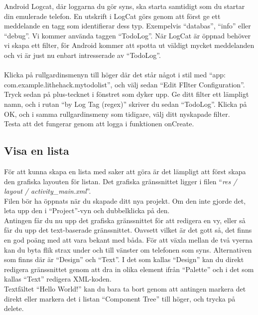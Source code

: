\documentclass[11 pt, titlepage]{article} %
\begin{document}
Android Logcat, där loggarna du gör syns, ska starta samtidigt som du startar din emulerade telefon.
En utskrift i LogCat görs genom att först ge ett meddelande en tagg som identifierar dess typ. Exempelvis “databas”, “info” eller “debug”. Vi kommer använda taggen “TodoLog”. När LogCat är öppnad behöver vi skapa ett filter, för Android kommer att spotta ut väldigt mycket meddelanden och vi är just nu enbart intresserade av “TodoLog”.\\
\\
Klicka på rullgardinsmenyn till höger där det står något i stil med ``app: com.example.lithehack.mytodolist'', och välj sedan ``Edit FIlter Configuration''. Tryck sedan på plus-tecknet i fönstret som dyker upp. Ge ditt filter ett lämpligt namn, och i rutan ``by Log Tag (regex)'' skriver du sedan ``TodoLog''. Klicka på OK, och i samma rullgardinsmeny som tidigare, välj ditt nyskapade filter.\\

Testa att det fungerar genom att logga i funktionen onCreate.


\subsection{Visa en lista}
För att kunna skapa en lista med saker att göra är det lämpligt att först skapa den grafiska layouten för listan. Det grafiska gränssnittet ligger i filen “\textit{res / layout / activity\_main.xml}”.\\
Filen bör ha öppnats när du skapade ditt nya projekt. Om den inte gjorde det, leta upp den i ``Project''-vyn och dubbelklicka på den. \\

Antingen får du nu upp det grafiska gränssnittet för att redigera en vy, eller så får du upp det text-baserade gränssnittet.
Oavsett vilket är det gott så, det finns en god poäng med att vara bekant med båda.
För att växla mellan de två vyerna kan du byta flik strax under och till vänster om telefonen som syns.
Alternativen som finns där är ``Design'' och ``Text''.
I det som kallas ``Design'' kan du direkt redigera gränssnittet genom att dra in olika element ifrån “Palette” och i det som kallas ``Text'' redigera XML-koden.\\

Textfältet “Hello World!” kan du bara ta bort genom att antingen markera det direkt eller markera det i listan “Component Tree” till höger, och trycka på delete.\\
\end{document}
